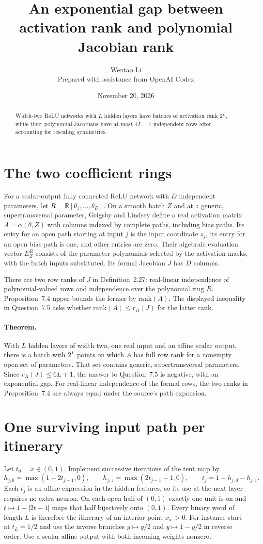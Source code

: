 \documentclass[11pt]{article}
\title{An exponential gap between activation rank and polynomial Jacobian rank}
\author{Wentao Li\\{\small Prepared with assistance from OpenAI Codex}}
\date{November 20, 2026}
\begin{document}
\maketitle
\begin{abstract}
Width-two ReLU networks with $L$ hidden layers have batches of activation rank $2^L$, while their polynomial Jacobians have at most $4L+1$ independent rows after accounting for rescaling symmetries.
\end{abstract}
\section*{The two coefficient rings}
For a scalar-output fully connected ReLU network with $D$ independent parameters, let $R=\mathbb R[\theta_1,\ldots,\theta_D]$. On a smooth batch $Z$ and at a generic, supertransversal parameter, Grigsby and Lindsey define a real activation matrix $A=\alpha(\theta,Z)$ with columns indexed by complete paths, including bias paths. Its entry for an open path starting at input $j$ is the input coordinate $z_j$, its entry for an open bias path is one, and other entries are zero. Their algebraic evaluation vector $E^R_Z$ consists of the parameter polynomials selected by the activation masks, with the batch inputs substituted. Its formal Jacobian $J$ has $D$ columns.

There are two row ranks of $J$ in Definition~2.27: real-linear independence of polynomial-valued rows and independence over the polynomial ring $R$. Proposition~7.4 upper bounds the former by $\mathrm{rank}(A)$. The displayed inequality in Question~7.5 asks whether $\mathrm{rank}(A)\le r_R(J)$ for the latter rank.

\paragraph{Theorem.} With $L$ hidden layers of width two, one real input and an affine scalar output, there is a batch with $2^L$ points on which $A$ has full row rank for a nonempty open set of parameters. That set contains generic, supertransversal parameters. Since $r_R(J)\le6L+1$, the answer to Question~7.5 is negative, with an exponential gap. For real-linear independence of the formal rows, the two ranks in Proposition~7.4 are always equal under the source's path expansion.

\section*{One surviving input path per itinerary}
Let $t_0=x\in(0,1)$. Implement successive iterations of the tent map by
\[
 h_{j,0}=\max(1-2t_{j-1},0),\qquad
 h_{j,1}=\max(2t_{j-1}-1,0),\qquad
 t_j=1-h_{j,0}-h_{j,1}.
\]
Each $t_j$ is an affine expression in the hidden features, so its use at the next layer requires no extra neuron. On each open half of $(0,1)$ exactly one unit is on and $t\mapsto 1-|2t-1|$ maps that half bijectively onto $(0,1)$. Every binary word of length $L$ is therefore the itinerary of an interior point $x_w>0$. For instance start at $t_L=1/2$ and use the inverse branches $y\mapsto y/2$ and $y\mapsto1-y/2$ in reverse order. Use a scalar affine output with both incoming weights nonzero.
\end{document}
